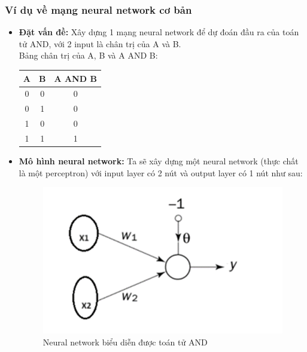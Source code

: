 \subsubsection{Ví dụ về mạng neural network cơ bản}
\begin{itemize}
    \item \textbf{Đặt vấn đề:} Xây dựng 1 mạng neural network để dự đoán đầu ra của toán tử AND, với 2 input là chân trị của A và B.\\
    Bảng chân trị của A, B và A AND B:
    \begin{table}[H]
    \centering
    \begin{tabular}{|c|c|c|}
    \hline
    \textbf{A} & \textbf{B} & \textbf{A AND B} \\ \hline
    0 & 0 & 0 \\ \hline
    0 & 1 & 0 \\ \hline
    1 & 0 & 0 \\ \hline
    1 & 1 & 1 \\ \hline
    \end{tabular}
    \end{table}
    \item \textbf{Mô hình neural network:}
    Ta sẽ xây dựng một neural network (thực chất là một perceptron) với input layer có 2 nút và output layer có 1 nút như sau:
    \begin{figure}[H]
        \centering
        \includegraphics[width=0.5\linewidth]{perceptron.png}
        \caption{Neural network biểu diễn được toán tử AND}
        

\end{figure}
\end{itemize}
